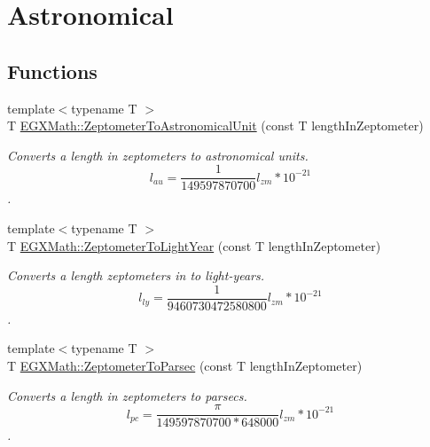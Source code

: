 \hypertarget{group___e_g_x_math-_conversions-_length_conversions-_s_i-_zeptometer-_astronomical}{}\section{Astronomical}
\label{group___e_g_x_math-_conversions-_length_conversions-_s_i-_zeptometer-_astronomical}
\subsection*{Functions}
\begin{DoxyCompactItemize}
\item 
{\footnotesize template$<$typename T $>$ }\\T \mbox{\hyperlink{group___e_g_x_math-_conversions-_length_conversions-_s_i-_zeptometer-_astronomical_ga01bceda59fbfc5414c72ccba254b365c}{E\+G\+X\+Math\+::\+Zeptometer\+To\+Astronomical\+Unit}} (const T length\+In\+Zeptometer)
\begin{DoxyCompactList}\small\item\em Converts a length in zeptometers to astronomical units. \[ l_{au}= \frac{1}{149597870700} l_{zm} * 10^{-21} \]. \end{DoxyCompactList}\item 
{\footnotesize template$<$typename T $>$ }\\T \mbox{\hyperlink{group___e_g_x_math-_conversions-_length_conversions-_s_i-_zeptometer-_astronomical_gaadccc6ef68b9d71b37be40ffbb845843}{E\+G\+X\+Math\+::\+Zeptometer\+To\+Light\+Year}} (const T length\+In\+Zeptometer)
\begin{DoxyCompactList}\small\item\em Converts a length zeptometers in to light-\/years. \[ l_{ly}= \frac{1}{9460730472580800} l_{zm} * 10^{-21} \]. \end{DoxyCompactList}\item 
{\footnotesize template$<$typename T $>$ }\\T \mbox{\hyperlink{group___e_g_x_math-_conversions-_length_conversions-_s_i-_zeptometer-_astronomical_gac8c853b247f3b577cee5510bd43fcd65}{E\+G\+X\+Math\+::\+Zeptometer\+To\+Parsec}} (const T length\+In\+Zeptometer)
\begin{DoxyCompactList}\small\item\em Converts a length in zeptometers to parsecs. \[ l_{pc}=\frac{\pi}{149597870700 * 648000} l_{zm} * 10^{-21} \]. \end{DoxyCompactList}\end{DoxyCompactItemize}


